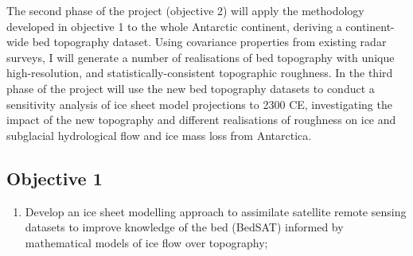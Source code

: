 The second phase of the project (objective 2) will apply the methodology developed in objective 1 to the whole Antarctic continent, deriving a continent-wide bed topography dataset. Using covariance properties from existing radar surveys, I will generate a number of realisations of bed topography with unique high-resolution, and statistically-consistent topographic roughness. In the third phase of the project will use the new bed topography datasets to conduct a sensitivity analysis of ice sheet model projections to 2300 CE, investigating the impact of the new topography and different realisations of roughness on ice and subglacial hydrological flow and ice mass loss from Antarctica.

\subsection*{Objective 1}
\begin{enumerate}
\item Develop an ice sheet modelling approach to assimilate satellite remote sensing
datasets to improve knowledge of the bed (BedSAT) informed by mathematical
models of ice flow over topography;
\end{enumerate}

